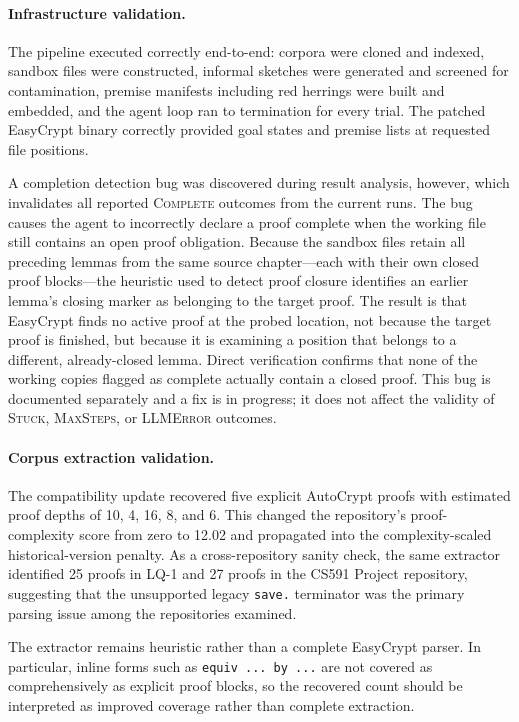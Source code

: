\documentclass[acmsmall,natbib=false]{acmart}
\begin{document}
\paragraph{Infrastructure validation.} The pipeline executed correctly end-to-end: corpora were cloned and indexed, sandbox files were constructed, informal sketches were generated and screened for contamination, premise manifests including red herrings were built and embedded, and the agent loop ran to termination for every trial. The patched EasyCrypt binary correctly provided goal states and premise lists at requested file positions.

A completion detection bug was discovered during result analysis, however, which invalidates all reported \textsc{Complete} outcomes from the current runs. The bug causes the agent to incorrectly declare a proof complete when the working file still contains an open proof obligation. Because the sandbox files retain all preceding lemmas from the same source chapter---each with their own closed proof blocks---the heuristic used to detect proof closure identifies an earlier lemma's closing marker as belonging to the target proof. The result is that EasyCrypt finds no active proof at the probed location, not because the target proof is finished, but because it is examining a position that belongs to a different, already-closed lemma. Direct verification confirms that none of the working copies flagged as complete actually contain a closed proof. This bug is documented separately and a fix is in progress; it does not affect the validity of \textsc{Stuck}, \textsc{MaxSteps}, or \textsc{LLMError} outcomes.

\paragraph{Corpus extraction validation.}
The compatibility update recovered five explicit AutoCrypt proofs with estimated proof depths of 10, 4, 16, 8, and 6. This changed the repository's proof-complexity score from zero to 12.02 and propagated into the complexity-scaled historical-version penalty. As a cross-repository sanity check, the same extractor identified 25 proofs in LQ-1 and 27 proofs in the CS591 Project repository, suggesting that the unsupported legacy \texttt{save.} terminator was the primary parsing issue among the repositories examined.

The extractor remains heuristic rather than a complete EasyCrypt parser. In particular, inline forms such as \texttt{equiv ... by ...} are not covered as comprehensively as explicit proof blocks, so the recovered count should be interpreted as improved coverage rather than complete extraction.
\end{document}
